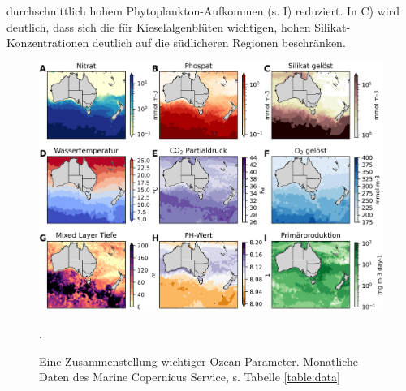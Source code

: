 \documentclass[12pt,a4paper,onecolumn]{scrartcl}
\begin{document}
durchschnittlich hohem Phytoplankton-Aufkommen (s. I) reduziert. In C) wird deutlich, dass sich die für Kieselalgenblüten wichtigen, hohen Silikat-Konzentrationen deutlich auf die südlicheren Regionen beschränken.
\begin{figure}[!htb]
\includegraphics[width=\textwidth]{bilder/factors_collage.png}
\caption{Eine Zusammenstellung wichtiger Ozean-Parameter. Monatliche Daten des  Marine Copernicus Service, s. Tabelle \ref{table:data}}. \label{fig:factors_collage}
\end{figure}
\end{document}
